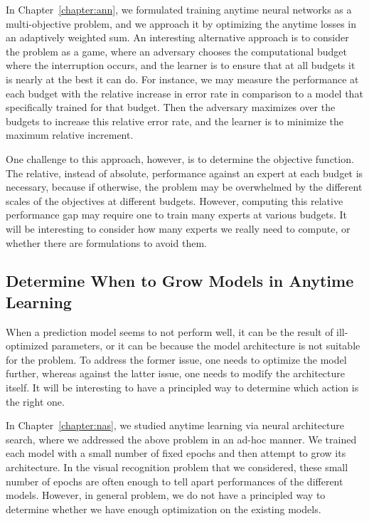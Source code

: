 In Chapter~\ref{chapter:ann}, we formulated training anytime neural networks as a multi-objective problem,
and we approach it by optimizing the anytime losses in an adaptively weighted sum. 
An interesting alternative approach is to consider the problem as a game, where an adversary chooses 
the computational budget where the interruption occurs, and the learner is to ensure that at all budgets it
is nearly at the best it can do. For instance, we may measure the performance at each budget with the relative
increase in error rate in comparison to a model that specifically trained for that budget. Then the adversary
maximizes over the budgets to increase this relative error rate, and the learner is to minimize the maximum 
relative increment. 

One challenge to this approach, however, is to determine the objective function. The relative, instead of absolute, 
performance against an expert at each budget is necessary, because if otherwise, the problem may be overwhelmed by the 
different scales of the objectives at different budgets. However, computing this relative performance gap may require 
one to train many experts at various budgets. It will be interesting to consider how many experts we really need
to compute, or whether there are formulations to avoid them. 


\subsection{Determine When to Grow Models in Anytime Learning}
When a prediction model seems to not perform well, it can be the result of ill-optimized parameters, or it can be 
because the model architecture is not suitable for the problem. 
To address the former issue, one needs to optimize the model further, whereas against the latter issue, one needs to 
modify the architecture itself. It will be interesting to have a principled way to determine which 
action is the right one. 

In Chapter~\ref{chapter:nas}, we studied anytime learning via neural architecture search, where we addressed the above
problem in an ad-hoc manner. We trained each model with a small number of fixed epochs and then attempt to grow its architecture. 
In the visual recognition problem that we considered, 
these small number of epochs are often enough to tell apart performances of the different models. However, in general
problem, we do not have a principled way to determine whether we have enough optimization on the existing models. 








